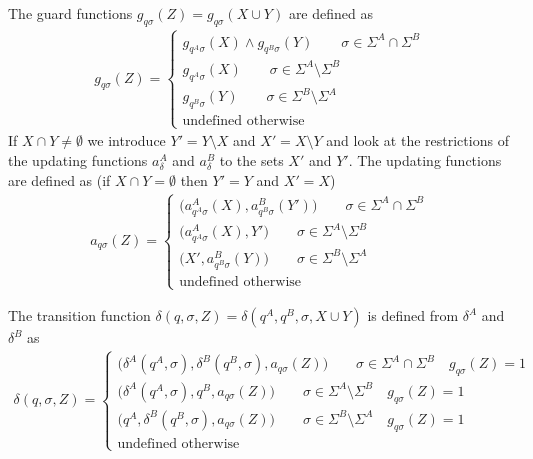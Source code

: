 \documentclass{article}
\begin{document}
The guard functions $g_{q \sigma}(Z)=g_{q \sigma}(X\cup Y)$ are
defined as
\begin{eqnarray}
g_{q \sigma}(Z)=\left\{
\begin{array}{ll}
g_{q^A\sigma}(X)\wedge g_{q^B\sigma}(Y) \quad\quad\sigma\in \Sigma^A \cap \Sigma^B\\
g_{q^A\sigma}(X) \quad\quad\sigma\in \Sigma^A \setminus \Sigma^B\\
g_{q^B\sigma}(Y) \quad\quad\sigma\in \Sigma^B \setminus \Sigma^A\\
\textrm{undefined       otherwise}
\end{array}\right.
\end{eqnarray}
If $X\cap Y\neq \emptyset$ we introduce $Y'=Y\setminus X$ and
$X'=X\setminus Y$ and look at the restrictions of the updating
functions $a^A_\delta$ and $a^B_\delta$ to the sets $X'$ and $Y'$.
The updating functions are defined as (if $X\cap Y=\emptyset$ then
$Y'=Y$ and $X'=X$)
\begin{eqnarray}
a_{q \sigma}(Z)=\left\{
\begin{array}{ll}
 \big(a^A_{q^A \sigma}(X), a^B_{q^B \sigma}(Y')\big)\quad\quad\sigma\in \Sigma^A \cap \Sigma^B\\
\big(a^A_{q^A \sigma}(X), Y'\big)\quad\quad\sigma\in \Sigma^A \setminus \Sigma^B\\
\big(X', a^B_{q^B \sigma}(Y)\big)\quad\quad\sigma\in \Sigma^B \setminus \Sigma^A\\
\textrm{undefined       otherwise}
\end{array}\right.
\end{eqnarray}


 The transition function
$\delta(q,\sigma,Z)=\delta(q^A,q^B,\sigma,X\cup Y)$ is defined
from $\delta^A$ and $\delta^B$ as
\begin{eqnarray}
\delta(q,\sigma,Z)=\left\{
\begin{array}{ll}
\big(\delta^A(q^A,\sigma),\delta^B(q^B,\sigma),a_{q \sigma}(Z)\big) \quad\quad \sigma\in \Sigma^A \cap \Sigma^B \quad g_{q \sigma}(Z)=1\\
\big(\delta^A(q^A,\sigma),q^B,a_{q \sigma}(Z)\big) \quad\quad \sigma\in \Sigma^A \setminus \Sigma^B \quad g_{q \sigma}(Z)=1\\
\big(q^A,\delta^B(q^B,\sigma),a_{q \sigma}(Z)\big) \quad\quad \sigma\in \Sigma^B \setminus \Sigma^A \quad g_{q \sigma}(Z)=1\\
\textrm{undefined       otherwise}
\end{array}\right.
\end{eqnarray}
\end{document}
